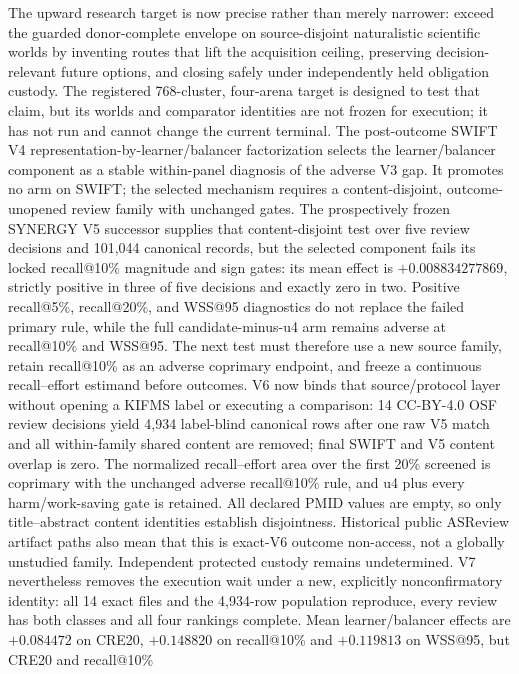 \documentclass[11pt]{article}
\theoremstyle{definition}
\begin{document}
The upward research target is now precise rather than merely narrower: exceed
the guarded donor-complete envelope on source-disjoint naturalistic scientific
worlds by inventing routes that lift the acquisition ceiling, preserving
decision-relevant future options, and closing safely under independently held
obligation custody.  The registered 768-cluster, four-arena target is designed
to test that claim, but its worlds and comparator identities are not frozen for
execution; it has not run and cannot change the current terminal.  The
post-outcome SWIFT V4 representation-by-learner/balancer factorization selects
the learner/balancer component as a stable within-panel diagnosis of the
adverse V3 gap.  It promotes no arm on SWIFT; the selected mechanism requires a
content-disjoint, outcome-unopened review family with unchanged gates.  The
prospectively frozen SYNERGY V5 successor supplies that content-disjoint test
over five review decisions and 101,044 canonical records, but the selected
component fails its locked recall@10\% magnitude and sign gates: its mean
effect is $+0.008834277869$, strictly positive in three of five decisions and
exactly zero in two.  Positive recall@5\%, recall@20\%, and WSS@95 diagnostics
do not replace the failed primary rule, while the full candidate-minus-u4 arm
remains adverse at recall@10\% and WSS@95.  The next test must therefore use a
new source family, retain recall@10\% as an adverse coprimary endpoint, and
freeze a continuous recall--effort estimand before outcomes.  V6 now binds that
source/protocol layer without opening a KIFMS label or executing a comparison:
14 CC-BY-4.0 OSF review decisions yield 4,934 label-blind canonical rows after
one raw V5 match and all within-family shared content are removed; final SWIFT
and V5 content overlap is zero.  The normalized recall--effort area over the
first 20\% screened is coprimary with the unchanged adverse recall@10\% rule,
and u4 plus every harm/work-saving gate is retained.  All declared PMID values
are empty, so only title--abstract content identities establish disjointness.
Historical public ASReview artifact paths also mean that this is exact-V6
outcome non-access, not a globally unstudied family.  Independent protected
custody remains undetermined. V7 nevertheless removes the execution
wait under a new, explicitly nonconfirmatory identity: all 14 exact files and
the 4,934-row population reproduce, every review has both classes and all four
rankings complete. Mean learner/balancer effects are $+0.084472$ on CRE20,
$+0.148820$ on recall@10\% and $+0.119813$ on WSS@95, but CRE20 and recall@10\%
\end{document}
